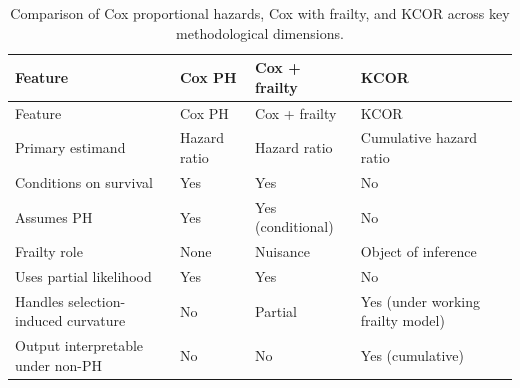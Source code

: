 \documentclass[
]{article}
\begin{document}
\begin{longtable}[]{@{}
  >{\raggedright\arraybackslash}p{}
  >{\raggedright\arraybackslash}p{}
  >{\raggedright\arraybackslash}p{}
  >{\raggedright\arraybackslash}p{}@{}}
\caption{Comparison of Cox proportional hazards, Cox with frailty, and
KCOR across key methodological
dimensions.}\label{tbl:cox_vs_kcor}\tabularnewline
\toprule\noalign{}
\begin{minipage}[b]{\linewidth}\raggedright
Feature
\end{minipage} & \begin{minipage}[b]{\linewidth}\raggedright
Cox PH
\end{minipage} & \begin{minipage}[b]{\linewidth}\raggedright
Cox + frailty
\end{minipage} & \begin{minipage}[b]{\linewidth}\raggedright
KCOR
\end{minipage} \\
\midrule\noalign{}
\endfirsthead
\toprule\noalign{}
\begin{minipage}[b]{\linewidth}\raggedright
Feature
\end{minipage} & \begin{minipage}[b]{\linewidth}\raggedright
Cox PH
\end{minipage} & \begin{minipage}[b]{\linewidth}\raggedright
Cox + frailty
\end{minipage} & \begin{minipage}[b]{\linewidth}\raggedright
KCOR
\end{minipage} \\
\midrule\noalign{}
\endhead
\bottomrule\noalign{}
\endlastfoot
Primary estimand & Hazard ratio & Hazard ratio & Cumulative hazard
ratio \\
Conditions on survival & Yes & Yes & No \\
Assumes PH & Yes & Yes (conditional) & No \\
Frailty role & None & Nuisance & Object of inference \\
Uses partial likelihood & Yes & Yes & No \\
Handles selection-induced curvature & No & Partial & Yes (under working
frailty model) \\
Output interpretable under non-PH & No & No & Yes (cumulative) \\
\end{longtable}
\end{document}
